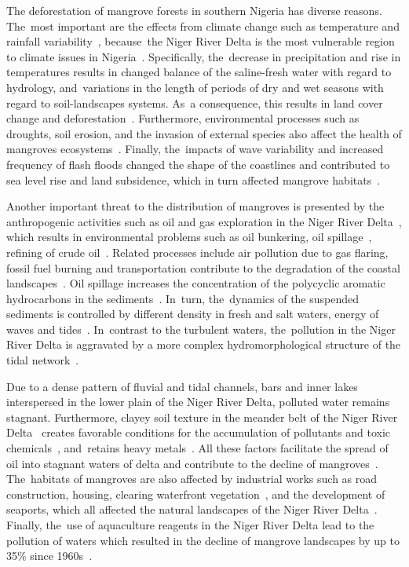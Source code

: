 \documentclass[jmse,article,accept,pdftex,moreauthors]{Definitions/mdpi}
\begin{document}
The deforestation of mangrove forests in southern Nigeria has diverse reasons. The~most important are the effects from climate change such as temperature and rainfall variability~\cite{Adefolalu,AREOLA2018153,w12020385}, because~the Niger {River} Delta is the most vulnerable region to climate issues in Nigeria~\cite{BALOGUN2022100304,hydrology7010019}. Specifically, the~decrease in precipitation and rise in temperatures results in changed balance of the saline-fresh water with regard to hydrology, and~variations in the length of periods of dry and wet seasons with regard to soil-landscapes systems. As~a consequence, this results in land cover change and deforestation~\cite{Akintuyi,KHADIJAT2021983}. Furthermore, environmental processes such as droughts, soil erosion, and the invasion of external species also affect the health of mangroves ecosystems~\cite{UKPONG199761}. Finally, the~impacts of wave variability and increased frequency of flash floods changed the shape of the coastlines and contributed to sea level rise and land subsidence, which in turn affected mangrove habitats~\cite{DARAMOLA2022102167,OSINOWO2021104471}. 

Another important threat to the distribution of mangroves is presented by the anthropogenic activities such as oil and gas exploration in the Niger River Delta~\cite{su142114256}, which results in environmental problems such as oil bunkering, oil spillage~\cite{OBIDA2021145854}, refining of crude oil~\cite{EYANKWARE2020100293}. Related processes include air pollution due to gas flaring, fossil fuel burning and transportation contribute to the degradation of the coastal landscapes~\cite{socsci11110525}. Oil spillage increases the concentration of the polycyclic aromatic hydrocarbons in the sediments~\cite{Sojinu}. In~turn, the~dynamics of the suspended sediments is controlled by different density in fresh and salt waters, energy of waves and tides~\cite{Munasinghe}.  In~contrast to the turbulent waters, the~pollution in the Niger River Delta is aggravated by a more complex hydromorphological structure of the tidal network~\cite{GEORGE2019103592}. 

Due to a dense pattern of fluvial and tidal channels, bars and inner lakes interspersed in the lower plain of the Niger River Delta, polluted water remains stagnant. Furthermore, clayey soil texture in the meander belt of the Niger River Delta~\cite{Kamalu} creates favorable conditions for the accumulation of pollutants and toxic chemicals~\cite{w13223295,toxics11010006,UKHUREBOR2021112872}, and~retains heavy metals~\cite{Amusan,OKOYE2022100222,OKOYE2021111273}. All these factors facilitate the spread of oil into stagnant waters of delta and contribute to the decline of mangroves~\cite{ONYIA2020377,ODISU2021111993,ZABBEY2014167}. The~habitats of mangroves are also affected by industrial works such as road construction, housing, clearing waterfront vegetation~\cite{Zabbey}, and the development of seaports, which all affected the natural landscapes of the Niger River Delta~\cite{OMIUNU198957}. Finally, the~use of aquaculture reagents in the Niger River Delta lead to the pollution of waters which resulted in the decline of mangrove landscapes by up to 35\% since 1960s~\cite{Godstime}. 
\end{document}
